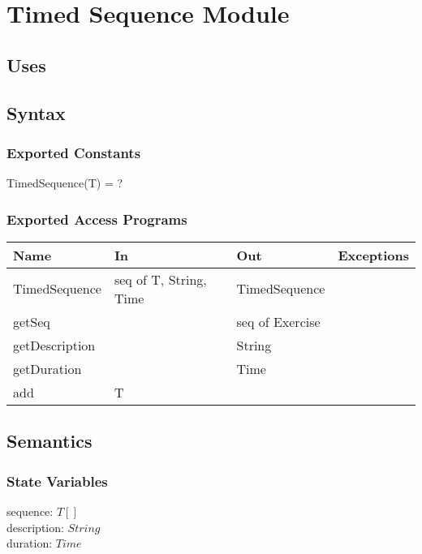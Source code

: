 \documentclass[12pt, titlepage]{article}
\begin{document}
\newpage

\section{Timed Sequence Module}

\subsection{Uses}

\subsection{Syntax}

\subsubsection{Exported Constants}
TimedSequence(T) = ?
\subsubsection{Exported Access Programs}

\begin{center}
	\begin{tabular}{p{4cm} p{4cm} p{4cm} p{2cm}}
		\hline
		\textbf{Name} & \textbf{In} & \textbf{Out} & \textbf{Exceptions} \\
		\hline
		TimedSequence & seq of T, String, Time & TimedSequence &  \\
		getSeq &  & seq of Exercise &  \\
		getDescription &  & String &  \\
		getDuration &  & Time &  \\
		add & T & &  \\
		\hline
	\end{tabular}
\end{center}

\subsection{Semantics}

\subsubsection{State Variables}
sequence: $T[]$ \\
description: $String$ \\
duration: $Time$ \\
\end{document}
